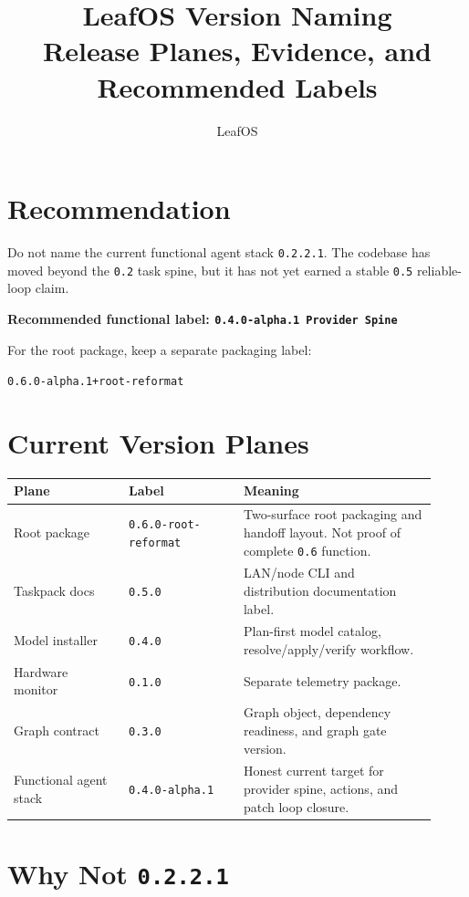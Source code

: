 \documentclass[11pt,a4paper]{article}
\title{\textbf{LeafOS Version Naming}\\[4pt]\large Release Planes, Evidence, and Recommended Labels}
\author{LeafOS}
\date{}
\begin{document}
\maketitle

\section*{Recommendation}

Do not name the current functional agent stack \texttt{0.2.2.1}. The codebase
has moved beyond the \texttt{0.2} task spine, but it has not yet earned a stable
\texttt{0.5} reliable-loop claim.

\begin{center}
\Large\textbf{Recommended functional label: \texttt{0.4.0-alpha.1 Provider Spine}}
\end{center}

For the root package, keep a separate packaging label:

\begin{center}
\texttt{0.6.0-alpha.1+root-reformat}
\end{center}

\section*{Current Version Planes}

\begin{longtable}{@{}p{0.25\linewidth}p{0.25\linewidth}p{0.42\linewidth}@{}}
\toprule
Plane & Label & Meaning \\
\midrule
Root package & \texttt{0.6.0-root-reformat} & Two-surface root packaging and handoff layout. Not proof of complete \texttt{0.6} function. \\
Taskpack docs & \texttt{0.5.0} & LAN/node CLI and distribution documentation label. \\
Model installer & \texttt{0.4.0} & Plan-first model catalog, resolve/apply/verify workflow. \\
Hardware monitor & \texttt{0.1.0} & Separate telemetry package. \\
Graph contract & \texttt{0.3.0} & Graph object, dependency readiness, and graph gate version. \\
Functional agent stack & \texttt{0.4.0-alpha.1} & Honest current target for provider spine, actions, and patch loop closure. \\
\bottomrule
\end{longtable}

\section*{Why Not \texttt{0.2.2.1}}
\end{document}
